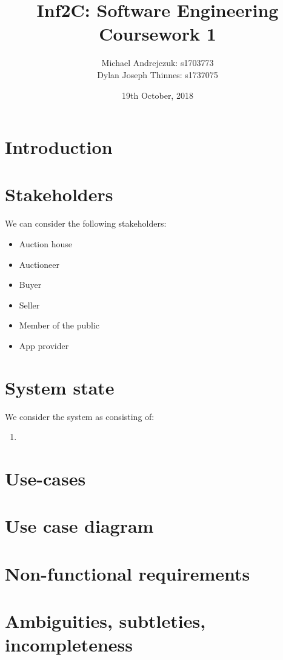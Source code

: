 \documentclass{article}
\begin{document}
\title{Inf2C: Software Engineering \\Coursework 1}
\author{Michael Andrejczuk: s1703773 \\
  Dylan Joseph Thinnes: s1737075}
\date{19th October, 2018}
\maketitle

\section{Introduction}

\section{Stakeholders}
We can consider the following stakeholders:
\begin{itemize}
\item Auction house
\item Auctioneer
\item Buyer
\item Seller
\item Member of the public
\item App provider
\end{itemize}
\section{System state}
We consider the system as consisting of:
\begin{enumerate}
\item
\end{enumerate}
\section{Use-cases}

\section{Use case diagram}

\section{Non-functional requirements}

\section{Ambiguities, subtleties, incompleteness}
\end{document}
